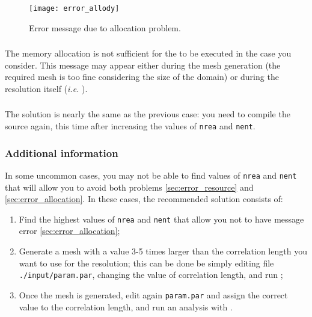 \begin{figure}[htpb]
\centering
\texttt{[image: error\_allody]}
\caption{Error message due to allocation problem.\label{fig:error_allocation}}
\end{figure}

\subsubsection{\question}

The memory allocation is not sufficient for the \diva to be executed in the case you consider. This message may appear either during the mesh generation (the required mesh is too fine considering the size of the domain) or during the resolution itself (\textit{i.e.} ).

\subsubsection{\answer}

The solution is nearly the same as the previous case: you need to compile the source again, this time after increasing the values of \texttt{nrea} and \texttt{nent}.

\subsubsection[Additional information]{Additional information \expert}

In some uncommon cases, you may not be able to find values of \texttt{nrea} and \texttt{nent} that will allow you to avoid both problems \ref{sec:error_resource} and \ref{sec:error_allocation}. In these cases, the recommended solution consists of:
\begin{enumerate}
\item Find the highest values of \texttt{nrea} and \texttt{nent} that allow you not to have message error \ref{sec:error_allocation};
\item Generate a mesh with a value 3-5 times larger than the correlation length you want to use for the resolution; this can be done be simply editing file \texttt{./input/param.par}, changing the value of correlation length, and run ;
\item Once the mesh is generated, edit again \texttt{param.par} and assign the correct value to the correlation length, and run an analysis with .
\end{enumerate}

